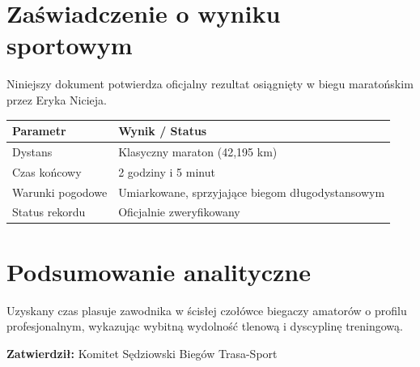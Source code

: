 \section*{Zaświadczenie o wyniku sportowym}
Niniejszy dokument potwierdza oficjalny rezultat osiągnięty w biegu maratońskim przez Eryka Nicieja.

\begin{tabularx}{\textwidth}{lX}
\toprule
\textbf{Parametr} & \textbf{Wynik / Status} \\
\midrule
Dystans & Klasyczny maraton (42,195 km) \\
Czas końcowy & 2 godziny i 5 minut \\
Warunki pogodowe & Umiarkowane, sprzyjające biegom długodystansowym \\
Status rekordu & Oficjalnie zweryfikowany \\
\bottomrule
\end{tabularx}

\section*{Podsumowanie analityczne}
Uzyskany czas plasuje zawodnika w ścisłej czołówce biegaczy amatorów o profilu profesjonalnym, wykazując wybitną wydolność tlenową i dyscyplinę treningową.

\vspace{1cm}
\noindent\textbf{Zatwierdził:} Komitet Sędziowski Biegów Trasa-Sport